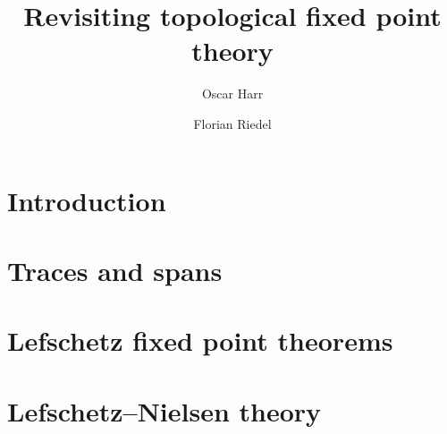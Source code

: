 \documentclass[english]{article}
\title{Revisiting topological fixed point theory}
\author{Oscar Harr \and Florian Riedel}
\begin{document}
\maketitle

\tableofcontents
\listoftodos
\section{Introduction}\label{sec: introduction}


\section{Traces and spans}\label{sec: trace theory}


\section{Lefschetz fixed point theorems}\label{sec: fixed point theorems}


\section{Lefschetz--Nielsen theory}\label{sec:nielsen-theory}



\printbibliography{}
\end{document}
